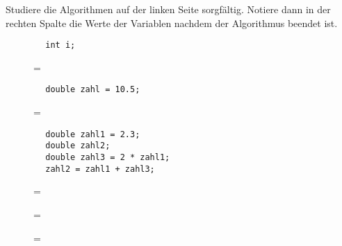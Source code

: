 \documentclass[10pt, a4paper, ngerman]{arbeitsblatt}
\begin{document}
\ReiheTitel

\begin{aufgabe}
Studiere die Algorithmen auf der linken Seite sorgfältig. Notiere dann in der
rechten Spalte die Werte der Variablen nachdem der Algorithmus beendet ist.


\begin{enuma}
	\item
	\begin{links}[.69]
		\begin{verbatim}
		int i;
		\end{verbatim}
	\end{links}\begin{rechts}[.29]
		\begin{description}
			\item[] =
		\end{description}
	\end{rechts}

	\item
	\begin{links}[.69]
		\begin{verbatim}
		double zahl = 10.5;
		\end{verbatim}
	\end{links}\begin{rechts}[.29]
		\begin{description}
			\item[] =
		\end{description}
	\end{rechts}

	\item
	\begin{links}[.69]
		\begin{verbatim}
		double zahl1 = 2.3;
		double zahl2;
		double zahl3 = 2 * zahl1;
		zahl2 = zahl1 + zahl3;
		\end{verbatim}
	\end{links}\begin{rechts}[.29]
		\begin{description}
			\item[] =
			\item[] =
			\item[] =
		\end{description}
	\end{rechts}


\end{enuma}
\end{aufgabe}
\end{document}
